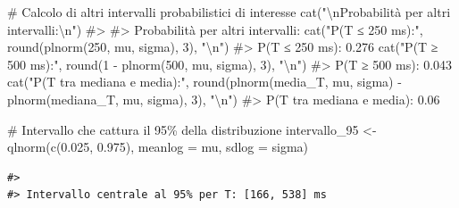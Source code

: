 \documentclass[
  letterpaper,
  DIV=11,
  numbers=noendperiod,
  oneside]{scrreprt}
\newenvironment{Shaded}{\begin{snugshade}}{\end{snugshade}}
\newcommand{\AttributeTok}[1]{\textcolor[rgb]{0.40,0.45,0.13}{#1}}
\newcommand{\CommentTok}[1]{\textcolor[rgb]{0.37,0.37,0.37}{#1}}
\newcommand{\DecValTok}[1]{\textcolor[rgb]{0.68,0.00,0.00}{#1}}
\newcommand{\FloatTok}[1]{\textcolor[rgb]{0.68,0.00,0.00}{#1}}
\newcommand{\FunctionTok}[1]{\textcolor[rgb]{0.28,0.35,0.67}{#1}}
\newcommand{\NormalTok}[1]{\textcolor[rgb]{0.00,0.23,0.31}{#1}}
\newcommand{\OtherTok}[1]{\textcolor[rgb]{0.00,0.23,0.31}{#1}}
\newcommand{\SpecialCharTok}[1]{\textcolor[rgb]{0.37,0.37,0.37}{#1}}
\newcommand{\StringTok}[1]{\textcolor[rgb]{0.13,0.47,0.30}{#1}}
\theoremstyle{definition}
\theoremstyle{plain}
\theoremstyle{definition}
\theoremstyle{remark}
\begin{document}
\begin{tcolorbox}
\begin{Shaded}
\begin{Highlighting}[]
\CommentTok{\# Calcolo di altri intervalli probabilistici di interesse}
\FunctionTok{cat}\NormalTok{(}\StringTok{"}\SpecialCharTok{\textbackslash{}n}\StringTok{Probabilità per altri intervalli:}\SpecialCharTok{\textbackslash{}n}\StringTok{"}\NormalTok{)}
\CommentTok{\#\textgreater{} }
\CommentTok{\#\textgreater{} Probabilità per altri intervalli:}
\FunctionTok{cat}\NormalTok{(}\StringTok{"P(T ≤ 250 ms):"}\NormalTok{, }\FunctionTok{round}\NormalTok{(}\FunctionTok{plnorm}\NormalTok{(}\DecValTok{250}\NormalTok{, mu, sigma), }\DecValTok{3}\NormalTok{), }\StringTok{"}\SpecialCharTok{\textbackslash{}n}\StringTok{"}\NormalTok{)}
\CommentTok{\#\textgreater{} P(T ≤ 250 ms): 0.276}
\FunctionTok{cat}\NormalTok{(}\StringTok{"P(T ≥ 500 ms):"}\NormalTok{, }\FunctionTok{round}\NormalTok{(}\DecValTok{1} \SpecialCharTok{{-}} \FunctionTok{plnorm}\NormalTok{(}\DecValTok{500}\NormalTok{, mu, sigma), }\DecValTok{3}\NormalTok{), }\StringTok{"}\SpecialCharTok{\textbackslash{}n}\StringTok{"}\NormalTok{)}
\CommentTok{\#\textgreater{} P(T ≥ 500 ms): 0.043}
\FunctionTok{cat}\NormalTok{(}\StringTok{"P(T tra mediana e media):"}\NormalTok{, }\FunctionTok{round}\NormalTok{(}\FunctionTok{plnorm}\NormalTok{(media\_T, mu, sigma) }\SpecialCharTok{{-}} \FunctionTok{plnorm}\NormalTok{(mediana\_T, mu, sigma), }\DecValTok{3}\NormalTok{), }\StringTok{"}\SpecialCharTok{\textbackslash{}n}\StringTok{"}\NormalTok{)}
\CommentTok{\#\textgreater{} P(T tra mediana e media): 0.06}
\end{Highlighting}
\end{Shaded}

\begin{Shaded}
\begin{Highlighting}[]
\CommentTok{\# Intervallo che cattura il 95\% della distribuzione}
\NormalTok{intervallo\_95 }\OtherTok{\textless{}{-}} \FunctionTok{qlnorm}\NormalTok{(}\FunctionTok{c}\NormalTok{(}\FloatTok{0.025}\NormalTok{, }\FloatTok{0.975}\NormalTok{), }\AttributeTok{meanlog =}\NormalTok{ mu, }\AttributeTok{sdlog =}\NormalTok{ sigma)}
\end{Highlighting}
\end{Shaded}

\begin{verbatim}
#> 
#> Intervallo centrale al 95% per T: [166, 538] ms
\end{verbatim}

\end{tcolorbox}
\end{document}
